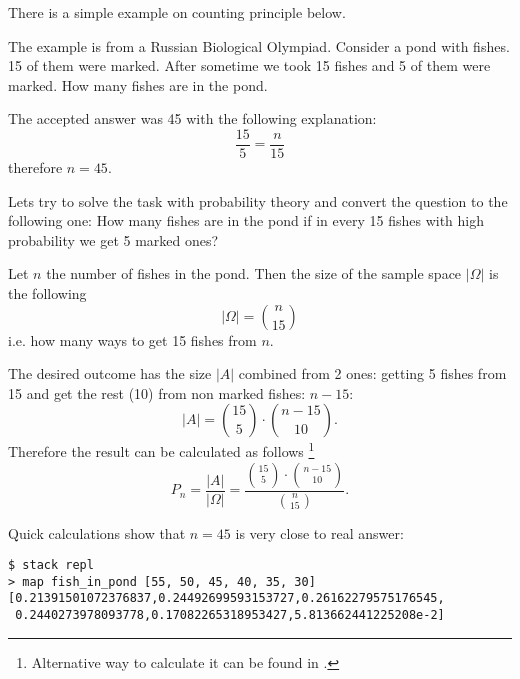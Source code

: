 There is a simple example on counting principle below.
\begin{example}
\label{ex:fishinpond}
The example is from a Russian Biological Olympiad. Consider a pond with
fishes. 15 of them were marked. After sometime we took 15 fishes and 5
of them were marked. How many fishes are in the pond.

The accepted answer was 45 with the following explanation: 
\[
\frac{15}{5} = \frac{n}{15}
\]
therefore $n=45$.

Lets try to solve the task with probability theory and convert the
question to the following one: How many fishes are in the pond if in
every 15 fishes with high probability we get 5 marked ones?

Let $n$ the number of fishes in the pond. Then the size of the sample
space $\left|\Omega\right|$ is the following
\[
\left|\Omega\right| = \binom{n}{15}
\]
i.e. how many ways to get 15 fishes from $n$.

The desired outcome has the size $\left|A\right|$ combined from 2
ones: getting 5 fishes from 15 and get the rest (10) from non marked
fishes: $n - 15$:
\[
\left|A\right| = \binom{15}{5} \cdot \binom{n - 15}{10}.
\]
Therefore the result can be calculated as follows
\footnote{
Alternative way to calculate it can be found in .
}
\begin{equation}
\label{eq:fishinpond}
P_n = \frac{\left|A\right|}{\left|\Omega\right|} = 
\frac{\binom{15}{5} \cdot \binom{n - 15}{10}}{\binom{n}{15}}.
\end{equation}

Quick calculations 
\cite{github:mathexperiments_ivanmurashko}
show that $n=45$ is very close to real answer: 
\begin{verbatim}
$ stack repl
> map fish_in_pond [55, 50, 45, 40, 35, 30]
[0.21391501072376837,0.24492699593153727,0.26162279575176545,
 0.2440273978093778,0.17082265318953427,5.813662441225208e-2]
\end{verbatim}

\end{example}


